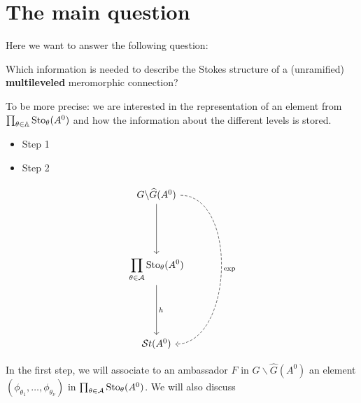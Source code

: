\chapter{The main question}
Here we want to answer the following question:
\begin{einr}
  Which information is needed to describe the Stokes structure of a
  (unramified) \textbf{multileveled} meromorphic connection?
\end{einr}
To be more precise: we are interested in the representation of an element from
$\prod_{\theta\in\mathbb{A}}\operatorname{Sto}_\theta(A^0)$ and how the information about the
different levels is stored.

\begin{comment}
  Ideas:
  \begin{enumerate}
    \item see algorithm~\cite[II.3.4]{Loday1994}
    \item search in \cite{Loday2014}
    \item generalize the ideas from \cite{boalch,thboalch}.
  \end{enumerate}
\end{comment}

\bgroup
{}
\begin{paracol}{2}\sloppy
\switchcolumn[0]\noindent
  \vspace*{17mm}
  \begin{itemize}
    \item[] Step 1 
    \item[] Step 2 
  \end{itemize}
\switchcolumn[1]\noindent
  \[ \begin{tikzcd}[column sep=0,row sep=1.8cm]
      G\backslash\hat G(A^0)\dar{\tikzmark{e0}}
      \arrow[dd,dashed, out=0,in=0,"\exp"]
    \\\displaystyle \prod_{\theta\in\cA}\Sto_\theta(A^0)
      \dar{\tikzmark{e1}h}
    \\\St(A^0)
  \end{tikzcd} \]
\end{paracol}
\egroup
In the first step, we will associate to an ambassador $\hat F$ in
$G\backslash\hat G(A^0)$ an element $(\phi_{\theta_1},\dots,\phi_{\theta_\nu})$
in $\prod_{\theta\in\mathcal{A}}\operatorname{Sto}_\theta(A^0)$. We will also discuss \TODO[\dots]


